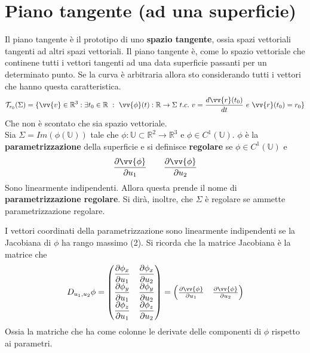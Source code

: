 \documentclass[a4paper, oneside]{article}
\begin{document}
\section{Piano tangente (ad una superficie)}
Il piano tangente è il prototipo di uno \textbf{spazio tangente}, 
ossia spazi vettoriali tangenti ad altri spazi vettoriali. Il piano tangente è, 
come lo spazio vettoriale che continene tutti i vettori tangenti ad una data superficie passanti
per un determinato punto. Se la curva è arbitraria allora sto considerando tutti i vettori 
che hanno questa caratteristica. 
\begin{align}
    \mathcal{T}_{r_0} (\Sigma) = \{ \vv{v} \in \mathbb{R}^{3} : \exists t_0 \in \mathbb{R} \ : \ \vv{\phi}(t) : \mathbb{R} \to \Sigma  \ t.c. \ v = \frac{d\vv{r}(t_0) }{dt} \ e \ \vv{r} (t_0) = r_0\}
\end{align}
Che non è scontato che sia spazio vettoriale.\\
Sia $\Sigma = Im(\phi(\mathbb{U}))$ tale che $\phi :\mathbb{U} \subset \mathbb{R}^{2} \to \mathbb{R}^{3}$ e $\phi \in C^{1}(\mathbb{U})$. $\phi$ è 
la \textbf{parametrizzazione} della superficie e si definisce \textbf{regolare} se $\phi \in C^{1}(\mathbb{U})$ e 
\begin{gather*}
    \frac{\partial \vv{\phi} }{\partial u_1} \qquad \frac{\partial \vv{\phi} }{\partial u_2}  
\end{gather*}
Sono linearmente indipendenti. Allora questa prende il nome di \textbf{parametrizzazione regolare}. Si dirà, 
inoltre, che $\Sigma$ è regolare se ammette parametrizzazione regolare. 

\begin{theorem}
    I vettori coordinati della parametrizzazione sono linearmente indipendenti se 
    la Jacobiana di $\phi$ ha rango massimo (2). Si ricorda che la matrice Jacobiana è
    la matrice che 
    \begin{gather*}
        D_{u_1, u_2}\phi  = \begin{pmatrix}
            \dfrac{\partial \phi_x}{\partial u_1} & \dfrac{\partial \phi_x}{\partial u_2} \\
             \dfrac{\partial \phi_y}{\partial u_1} & \dfrac{\partial \phi_y}{\partial u_2} \\
            \dfrac{\partial \phi_z}{\partial u_1} & \dfrac{\partial \phi_z}{\partial u_2} \\
        \end{pmatrix} = \begin{pmatrix}
            \frac{\partial \vv{\phi} }{\partial u_1} & \frac{\partial \vv{\phi} }{\partial u_2}  
        \end{pmatrix}
    \end{gather*}
    Ossia la matriche che ha come colonne le derivate delle componenti di $\phi$ rispetto ai 
    parametri.
\end{theorem}
\end{document}
